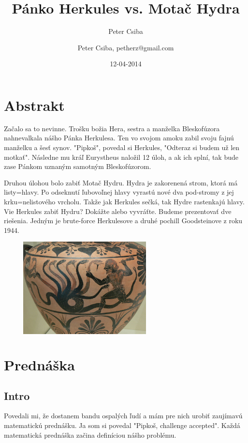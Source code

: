 \documentclass[12pt,a4paper]{article}
\author{Peter Csiba}
\title{Pánko Herkules vs. Motač Hydra}
\date{12-04-2014}
\author{Peter Csiba, petherz@gmail.com}
\begin{document}
\maketitle

\section*{Abstrakt}
Začalo sa to nevinne. Trošku božia Hera, sestra a manželka Bleskofúzora nahnevalkala nášho Pánka Herkulesa. Ten vo svojom amoku zabil svoju fajnú manželku a šesť synov. "Pipkoš", povedal si Herkules, "Odteraz si budem už len motkať". Následne mu kráľ Eurystheus naložil 12 úloh, a ak ich splní, tak bude zase Pánkom uznaným samotným Bleskofúzorom. 

Druhou úlohou bolo zabiť Motač Hydru. Hydra je zakorenená strom, ktorá má listy=hlavy. Po odseknutí ľubovoľnej hlavy vyrastú nové dva pod-stromy z jej krku=nelistového vrcholu. Takže jak Herkules sečká, tak Hydre rastenkajú hlavy. Vie Herkules zabiť Hydru? Dokážte alebo vyvráťte. Budeme prezentovať dve riešenia. Jedným je brute-force Herkulesove a druhé pochill Goodsteinove z roku 1944. 

\begin{figure}[H]
\centering
\includegraphics[width=0.6\textwidth]{hydra.png}
\end{figure} 

\section*{Prednáška}

\subsection*{Intro} 

Povedali mi, že dostanem bandu ospalých ľudí a mám pre nich urobiť zaujímavú matematickú prednášku. Ja som si povedal "Pipkoš, challenge accepted". Každá matematická prednáška začina definíciou nášho problému. 
\end{document}
